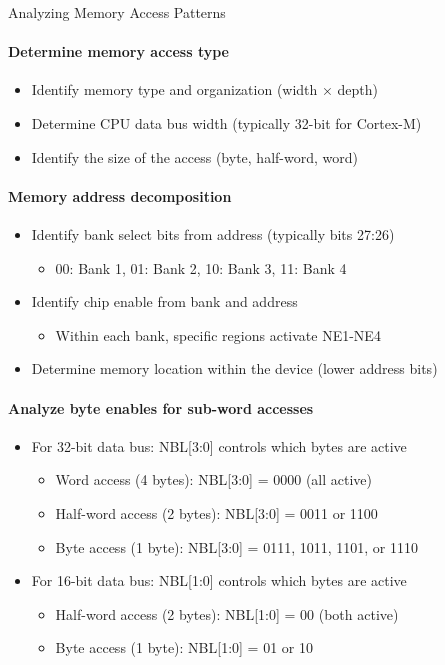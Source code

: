 \begin{KR}{Analyzing Memory Access Patterns}
\paragraph{Determine memory access type}
\begin{itemize}
    \item Identify memory type and organization (width × depth)
    \item Determine CPU data bus width (typically 32-bit for Cortex-M)
    \item Identify the size of the access (byte, half-word, word)
\end{itemize}

\paragraph{Memory address decomposition}
\begin{itemize}
    \item Identify bank select bits from address (typically bits 27:26)
    \begin{itemize}
        \item 00: Bank 1, 01: Bank 2, 10: Bank 3, 11: Bank 4
    \end{itemize}
    \item Identify chip enable from bank and address
    \begin{itemize}
        \item Within each bank, specific regions activate NE1-NE4
    \end{itemize}
    \item Determine memory location within the device (lower address bits)
\end{itemize}

\paragraph{Analyze byte enables for sub-word accesses}
\begin{itemize}
    \item For 32-bit data bus: NBL[3:0] controls which bytes are active
    \begin{itemize}
        \item Word access (4 bytes): NBL[3:0] = 0000 (all active)
        \item Half-word access (2 bytes): NBL[3:0] = 0011 or 1100
        \item Byte access (1 byte): NBL[3:0] = 0111, 1011, 1101, or 1110
    \end{itemize}
    \item For 16-bit data bus: NBL[1:0] controls which bytes are active
    \begin{itemize}
        \item Half-word access (2 bytes): NBL[1:0] = 00 (both active)
        \item Byte access (1 byte): NBL[1:0] = 01 or 10
    \end{itemize}
\end{itemize}


\end{KR}
